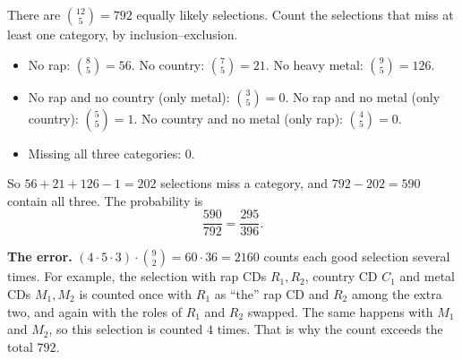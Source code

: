 There are $\binom{12}{5}=792$ equally likely selections. Count the selections that miss at least one category, by inclusion--exclusion.
\begin{itemize}
\item No rap: $\binom85=56$. No country: $\binom75=21$. No heavy metal: $\binom95=126$.
\item No rap and no country (only metal): $\binom35=0$. No rap and no metal (only country): $\binom55=1$. No country and no metal (only rap): $\binom45=0$.
\item Missing all three categories: $0$.
\end{itemize}
So $56+21+126-1=202$ selections miss a category, and $792-202=590$ contain all three. The probability is
\[
\dfrac{590}{792}=\boxed{\dfrac{295}{396}}.
\]

\textbf{The error.} $(4\cdot5\cdot3)\cdot\binom92=60\cdot36=2160$ counts each good selection several times. For example, the selection with rap CDs $R_1,R_2$, country CD $C_1$ and metal CDs $M_1,M_2$ is counted once with $R_1$ as ``the'' rap CD and $R_2$ among the extra two, and again with the roles of $R_1$ and $R_2$ swapped. The same happens with $M_1$ and $M_2$, so this selection is counted $4$ times. That is why the count exceeds the total $792$.
